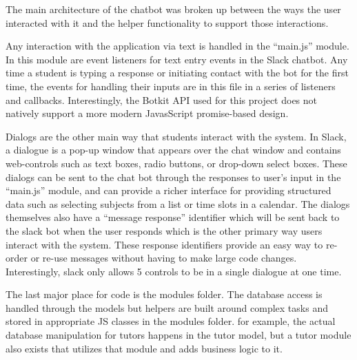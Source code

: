 The main architecture of the chatbot was broken up between the ways the user
interacted with it and the helper functionality to support those interactions.  

Any interaction with the application via text is handled in the ``main.js''
module. In this module are event listeners for text entry events in the Slack
chatbot.  Any time a student is typing a response or initiating contact with the
bot for the first time, the events for handling their inputs are in this file in
a series of listeners and callbacks.  Interestingly, the Botkit API used for
this project does not natively support a more modern JavasScript promise-based
design.

Dialogs are the other main way that students interact with the system.  In
Slack, a dialogue is a pop-up window that appears over the chat window and
contains web-controls such as text boxes, radio buttons, or drop-down select
boxes. These dialogs can be sent to the chat bot through the responses to user's
input in the ``main.js'' module, and can provide a richer interface for
providing structured data such as selecting subjects from a list or time slots
in a calendar.  The dialogs themselves also have a ``message response''
identifier which will be sent back to the slack bot when the user responds
which is the other primary way users interact with the system.  These response
identifiers provide an easy way to re-order or re-use messages without having to
make large code changes.  %
Interestingly, slack only allows 5 controls to be in a single dialogue at one
time.  

The last major place for code is the modules folder.  The database access is
handled through the models but helpers are built around complex tasks and stored
in appropriate JS classes in the modules folder.  for example, the actual
database manipulation for tutors happens in the tutor model, but a tutor module
also exists that utilizes that module and adds business logic to it.  


